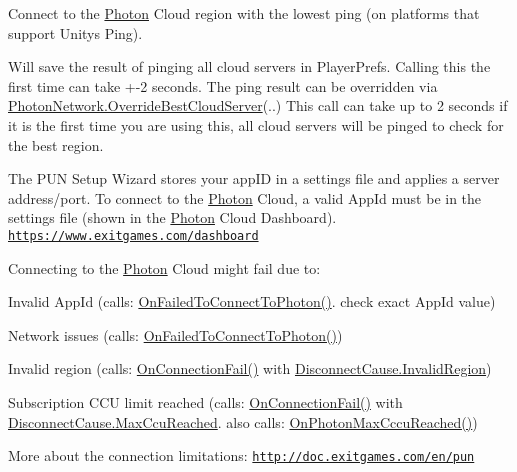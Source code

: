 Connect to the \hyperlink{namespace_photon}{Photon} Cloud region with the lowest ping (on platforms that support Unity\textquotesingle{}s Ping). 

Will save the result of pinging all cloud servers in Player\+Prefs. Calling this the first time can take +-\/2 seconds. The ping result can be overridden via \hyperlink{class_photon_network_a7dc90dd05d697c3f8f04e50cc0e039b2}{Photon\+Network.\+Override\+Best\+Cloud\+Server}(..) This call can take up to 2 seconds if it is the first time you are using this, all cloud servers will be pinged to check for the best region.

The P\+UN Setup Wizard stores your app\+ID in a settings file and applies a server address/port. To connect to the \hyperlink{namespace_photon}{Photon} Cloud, a valid App\+Id must be in the settings file (shown in the \hyperlink{namespace_photon}{Photon} Cloud Dashboard). \href{https://www.exitgames.com/dashboard}{\tt https\+://www.\+exitgames.\+com/dashboard}

Connecting to the \hyperlink{namespace_photon}{Photon} Cloud might fail due to\+:
\begin{DoxyItemize}
\item Invalid App\+Id (calls\+: \hyperlink{group__public_api_ggaf30bbea51cc8c4b1ddc239d1c5c1468fa7546497495fd3c2f785966943e8d0568}{On\+Failed\+To\+Connect\+To\+Photon()}. check exact App\+Id value)
\item Network issues (calls\+: \hyperlink{group__public_api_ggaf30bbea51cc8c4b1ddc239d1c5c1468fa7546497495fd3c2f785966943e8d0568}{On\+Failed\+To\+Connect\+To\+Photon()})
\item Invalid region (calls\+: \hyperlink{group__public_api_ggaf30bbea51cc8c4b1ddc239d1c5c1468fa90c9be8eb52ae376a236bfd0a28d7918}{On\+Connection\+Fail()} with \hyperlink{group__public_api_ggad61b1461cf60ad9e8d86923d111d5cc9aa8534012cb63e62c0b3a2335206117cc}{Disconnect\+Cause.\+Invalid\+Region})
\item Subscription C\+CU limit reached (calls\+: \hyperlink{group__public_api_ggaf30bbea51cc8c4b1ddc239d1c5c1468fa90c9be8eb52ae376a236bfd0a28d7918}{On\+Connection\+Fail()} with \hyperlink{group__public_api_ggad61b1461cf60ad9e8d86923d111d5cc9a522f961eb7a2b35f0ef4b99b4ad3bb0a}{Disconnect\+Cause.\+Max\+Ccu\+Reached}. also calls\+: \hyperlink{group__public_api_ggaf30bbea51cc8c4b1ddc239d1c5c1468fa1d2567b2c2f8ec1799a293b0359b4046}{On\+Photon\+Max\+Cccu\+Reached()})
\end{DoxyItemize}

More about the connection limitations\+: \href{http://doc.exitgames.com/en/pun}{\tt http\+://doc.\+exitgames.\+com/en/pun} 


